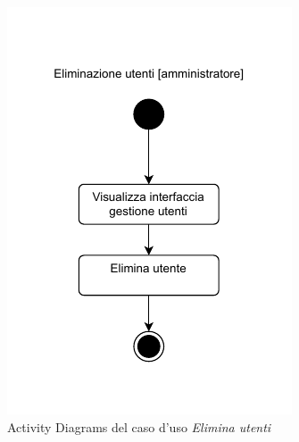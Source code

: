 \documentclass[a4paper]{article}
\begin{document}
\begin{figure}[H]
    \centering
    \includegraphics{./figures/eliminazione_utenti_ac}
    \caption{Activity Diagrams del caso d'uso \textit{Elimina utenti}}
    \label{fig:ac_eliminazione_utenti}
\end{figure}
\end{document}
